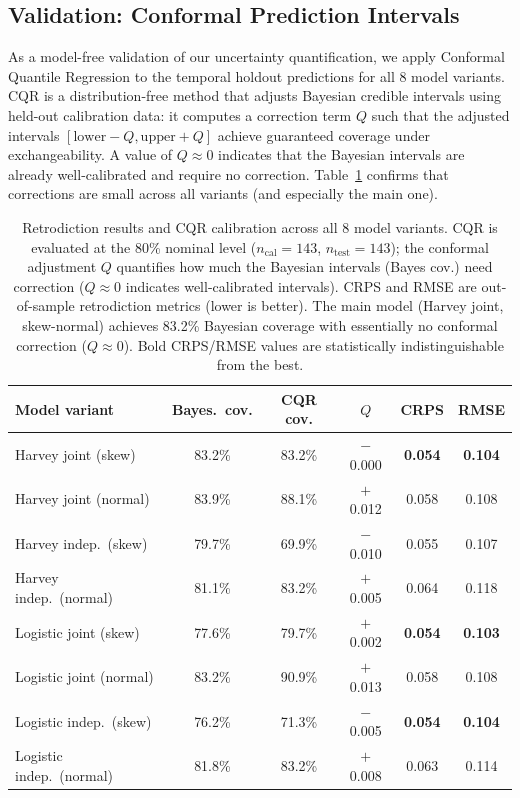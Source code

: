 \documentclass[letterpaper,twocolumn]{article}
\newcommand{\revised}[1]{#1}
\begin{document}
\revised{
\subsection{Validation: Conformal Prediction Intervals}

As a model-free validation of our uncertainty quantification, we apply Conformal Quantile Regression \citep[CQR;][]{romano_conformalized_2019} to the temporal holdout predictions for all 8 model variants. CQR is a distribution-free method that adjusts Bayesian credible intervals using held-out calibration data: it computes a correction term $Q$ such that the adjusted intervals $[\text{lower} - Q, \text{upper} + Q]$ achieve guaranteed coverage under exchangeability. A value of $Q \approx 0$ indicates that the Bayesian intervals are already well-calibrated and require no correction. Table~\ref{tab:cqr_results} confirms that corrections are small across all variants (and especially the main one).

\begin{table}[ht]
\centering
\begin{tabular}{lccccc}
\toprule
Model variant & Bayes.\ cov. & CQR cov. & $Q$ & CRPS & RMSE \\
\midrule
Harvey joint (skew) & 83.2\% & 83.2\% & $-$0.000 & \textbf{0.054} & \textbf{0.104} \\
Harvey joint (normal) & 83.9\% & 88.1\% & $+$0.012 & 0.058 & 0.108 \\
Harvey indep.\ (skew) & 79.7\% & 69.9\% & $-$0.010 & 0.055 & 0.107 \\
Harvey indep.\ (normal) & 81.1\% & 83.2\% & $+$0.005 & 0.064 & 0.118 \\
Logistic joint (skew) & 77.6\% & 79.7\% & $+$0.002 & \textbf{0.054} & \textbf{0.103} \\
Logistic joint (normal) & 83.2\% & 90.9\% & $+$0.013 & 0.058 & 0.108 \\
Logistic indep.\ (skew) & 76.2\% & 71.3\% & $-$0.005 & \textbf{0.054} & \textbf{0.104} \\
Logistic indep.\ (normal) & 81.8\% & 83.2\% & $+$0.008 & 0.063 & 0.114 \\
\bottomrule
\end{tabular}
\caption{Retrodiction results and CQR calibration across all 8 model variants. CQR is evaluated at the 80\% nominal level ($n_{\text{cal}}=143$, $n_{\text{test}}=143$); the conformal adjustment $Q$ quantifies how much the Bayesian intervals (Bayes cov.) need correction ($Q \approx 0$ indicates well-calibrated intervals). CRPS and RMSE are out-of-sample retrodiction metrics (lower is better). The main model (Harvey joint, skew-normal) achieves 83.2\% Bayesian coverage with essentially no conformal correction ($Q \approx 0$). Bold CRPS/RMSE values are statistically indistinguishable from the best.}
\label{tab:cqr_results}
\end{table}
}
\end{document}
